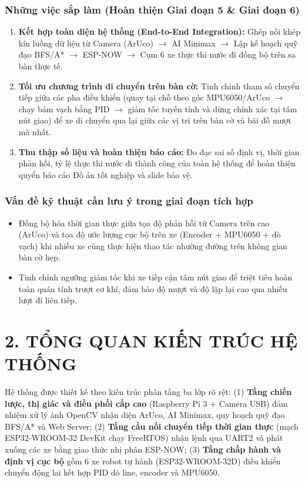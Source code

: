 \documentclass[14pt,a4paper]{extreport}
\begin{document}
\subsection*{Những việc sắp làm (Hoàn thiện Giai đoạn 5 \& Giai đoạn 6)}
\begin{enumerate}
    \item \textbf{Kết hợp toàn diện hệ thống (End-to-End Integration):} Ghép nối khép kín luồng dữ liệu từ Camera (ArUco) $\rightarrow$ AI Minimax $\rightarrow$ Lập kế hoạch quỹ đạo BFS/A* $\rightarrow$ ESP-NOW $\rightarrow$ Cụm 6 xe thực thi nước đi đồng bộ trên sa bàn thực tế.
    \item \textbf{Tối ưu chương trình di chuyển trên bàn cờ:} Tinh chỉnh tham số chuyển tiếp giữa các pha điều khiển (quay tại chỗ theo góc MPU6050/ArUco $\rightarrow$ chạy bám vạch bằng PID $\rightarrow$ giảm tốc tuyến tính và dừng chính xác tại tâm nút giao) để xe di chuyển qua lại giữa các vị trí trên bàn cờ và bãi đỗ mượt mà nhất.
    \item \textbf{Thu thập số liệu và hoàn thiện báo cáo:} Đo đạc sai số định vị, thời gian phản hồi, tỷ lệ thực thi nước đi thành công của toàn hệ thống để hoàn thiện quyển báo cáo Đồ án tốt nghiệp và slide bảo vệ.
\end{enumerate}
 
\subsection*{Vấn đề kỹ thuật cần lưu ý trong giai đoạn tích hợp}
\begin{itemize}
    \item Đồng bộ hóa thời gian thực giữa tọa độ phản hồi từ Camera trên cao (ArUco) và tọa độ ước lượng cục bộ trên xe (Encoder + MPU6050 + dò vạch) khi nhiều xe cùng thực hiện thao tác nhường đường trên không gian bàn cờ hẹp.
    \item Tinh chỉnh ngưỡng giảm tốc khi xe tiếp cận tâm nút giao để triệt tiêu hoàn toàn quán tính trượt cơ khí, đảm bảo độ mượt và độ lặp lại cao qua nhiều lượt đi liên tiếp.
\end{itemize}

\chapter*{2. TỔNG QUAN KIẾN TRÚC HỆ THỐNG}
 
Hệ thống được thiết kế theo kiến trúc phân tầng ba lớp rõ rệt: (1) \textbf{Tầng chiến lược, thị giác và điều phối cấp cao} (Raspberry Pi 3 + Camera USB) đảm nhiệm xử lý ảnh OpenCV nhận diện ArUco, AI Minimax, quy hoạch quỹ đạo BFS/A* và Web Server; (2) \textbf{Tầng cầu nối chuyển tiếp thời gian thực} (mạch ESP32-WROOM-32 DevKit chạy FreeRTOS) nhận lệnh qua UART2 và phát xuống các xe bằng giao thức nhị phân ESP-NOW; (3) \textbf{Tầng chấp hành và định vị cục bộ} gồm 6 xe robot tự hành (ESP32-WROOM-32D) điều khiển chuyển động lai kết hợp PID dò line, encoder và MPU6050.
 
\end{document}
